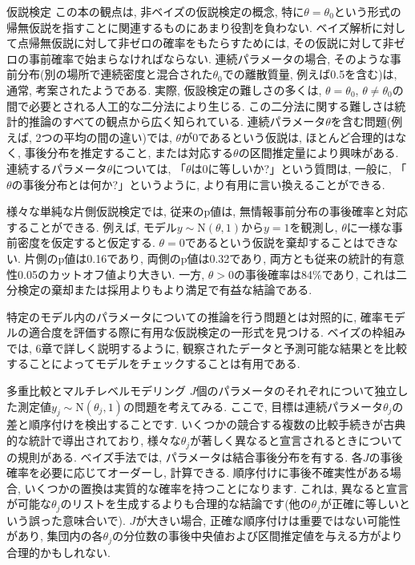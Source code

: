 \documentclass[10pt,dvipdfmx,a4]{beamer}
\begin{document}

\begin{frame}{仮説検定}
この本の観点は, 非ベイズの仮説検定の概念, 特に$\theta=\theta_0$という形式の帰無仮説を指すことに関連するものにあまり役割を負わない.
ベイズ解析に対して点帰無仮説に対して非ゼロの確率をもたらすためには, その仮説に対して非ゼロの事前確率で始まらなければならない.
連続パラメータの場合, そのような事前分布(別の場所で連続密度と混合された$\theta_0$での離散質量, 例えば0.5を含む)は, 通常, 考案されたようである.
実際, 仮設検定の難しさの多くは, $\theta=\theta_0$, $\theta\neq \theta_0$の間で必要とされる人工的な二分法により生じる.
この二分法に関する難しさは統計的推論のすべての観点から広く知られている.
連続パラメータ$\theta$を含む問題(例えば, 2つの平均の間の違い)では, $\theta$が0であるという仮説は, ほとんど合理的はなく, 事後分布を推定すること, または対応する$\theta$の区間推定量により興味がある.
連続するパラメータ$\theta$については, 「$\theta$は0に等しいか?」という質問は, 一般に, 「$\theta$の事後分布とは何か?」というように, より有用に言い換えることができる.
\end{frame}


\begin{frame}
様々な単純な片側仮説検定では, 従来のp値は, 無情報事前分布の事後確率と対応することができる.
例えば, モデル$y\sim\text{N}(\theta, 1)$から$y=1$を観測し, $\theta$に一様な事前密度を仮定すると仮定する.
$\theta=0$であるという仮説を棄却することはできない.
片側のp値は0.16であり, 両側のp値は0.32であり, 両方とも従来の統計的有意性0.05のカットオフ値より大きい.
一方, $\theta>0$の事後確率は84\%であり, これは二分検定の棄却または採用よりもより満足で有益な結論である.

特定のモデル内のパラメータについての推論を行う問題とは対照的に, 確率モデルの適合度を評価する際に有用な仮説検定の一形式を見つける.
ベイズの枠組みでは, 6章で詳しく説明するように, 観察されたデータと予測可能な結果とを比較することによってモデルをチェックすることは有用である.
\end{frame}


\begin{frame}{多重比較とマルチレベルモデリング}
$J$個のパラメータのそれぞれについて独立した測定値$y_j\sim\text{N}(\theta_j, 1)$の問題を考えてみる.
ここで, 目標は連続パラメータ$\theta_j$の差と順序付けを検出することです.
いくつかの競合する複数の比較手続きが古典的な統計で導出されており, 様々な$\theta_j$が著しく異なると宣言されるときについての規則がある.
ベイズ手法では, パラメータは結合事後分布を有する.
各$J$の事後確率を必要に応じてオーダーし, 計算できる.
順序付けに事後不確実性がある場合, いくつかの置換は実質的な確率を持つことになります.
これは, 異なると宣言が可能な$\theta_j$のリストを生成するよりも合理的な結論です(他の$\theta_j$が正確に等しいという誤った意味合いで).
$J$が大きい場合, 正確な順序付けは重要ではない可能性があり, 集団内の各$\theta_j$の分位数の事後中央値および区間推定値を与える方がより合理的かもしれない.
\end{frame}
\end{document}
